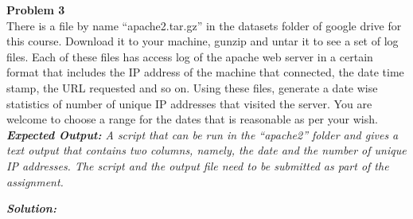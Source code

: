 \documentclass[a4paper, 11pt]{article}
\newenvironment{problem}[2][Problem]
    { \begin{mdframed}[backgroundcolor=gray!20] \textbf{#1 #2} \\}
    {  \end{mdframed}}
\newenvironment{solution}
    {\textbf{\textit{Solution:}}}
    {}
\begin{document}
%

\begin{problem}{3}
There is a file by name “apache2.tar.gz” in the datasets folder of google drive for this course. Download it
to your machine, gunzip and untar it to see a set of log files. Each of these files has access log of the apache
web server in a certain format that includes the IP address of the machine that connected, the date time
stamp, the URL requested and so on. Using these files, generate a date wise statistics of number of unique IP
addresses that visited the server. You are welcome to choose a range for the dates that is reasonable as per
your wish. 
\\ \textit{\textbf{Expected Output:} A script that can be run in the “apache2” folder and gives a text output that contains two
columns, namely, the date and the number of unique IP addresses. The script and the output file need to be
submitted as part of the assignment.}
\end{problem}
\begin{solution}


\end{solution}
\end{document}
